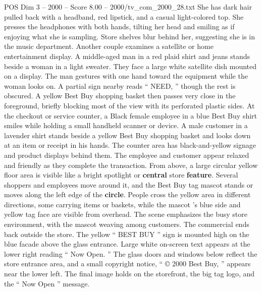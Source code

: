 \begin{textsample}{POS Dim 3 – 2000 – Score 8.00 – 2000/tv\_com\_2000\_28.txt}
She has dark hair pulled back with a headband, red lipstick, and a casual light-colored top.
She presses the headphones with both hands, tilting her head and smiling as if enjoying what she is sampling.
Store shelves blur behind her, suggesting she is in the music department.
Another couple examines a satellite or home entertainment display.
A middle-aged man in a red plaid shirt and jeans stands beside a woman in a light sweater.
They face a large white satellite dish mounted on a display.
The man gestures with one hand toward the equipment while the woman looks on.
A partial sign nearby reads “ NEED, ” though the rest is obscured.
A yellow Best Buy shopping basket then passes very close in the foreground, briefly blocking most of the view with its perforated plastic sides.
At the checkout or service counter, a Black female employee in a blue Best Buy shirt smiles while holding a small handheld scanner or device.
A male customer in a lavender shirt stands beside a yellow Best Buy shopping basket and looks down at an item or receipt in his hands.
The counter area has black-and-yellow signage and product displays behind them.
The employee and customer appear relaxed and friendly as they complete the transaction.
From above, a large circular yellow floor area is visible like a bright spotlight or \textbf{central} store \textbf{feature}.
Several shoppers and employees move around it, and the Best Buy tag mascot stands or moves along the left edge of the \textbf{circle}.
People cross the yellow area in different directions, some carrying items or baskets, while the mascot ’s blue side and yellow tag face are visible from overhead.
The scene emphasizes the busy store environment, with the mascot weaving among customers.
The commercial ends back outside the store.
The yellow “ BEST BUY ” sign is mounted high on the blue facade above the glass entrance.
Large white on-screen text appears at the lower right reading “ Now Open. ” The glass doors and windows below reflect the store entrance area, and a small copyright notice, “ {\EmojiFont ©} 2000 Best Buy, ” appears near the lower left.
The final image holds on the storefront, the big tag logo, and the “ Now Open ” message.

\end{textsample}
